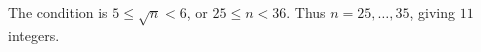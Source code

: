 The condition is $5\le\sqrt n<6$, or $25\le n<36$. Thus $n=25,\ldots,35$, giving $\boxed{11}$ integers.
